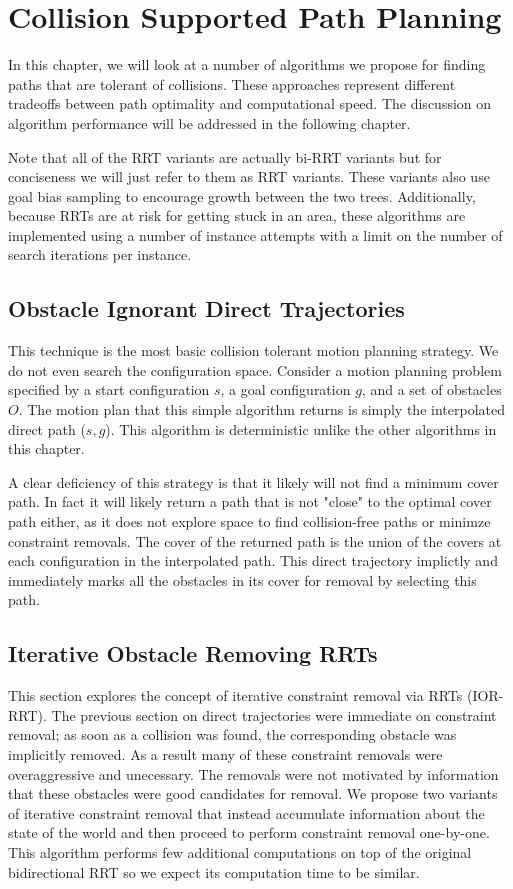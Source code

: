 \chapter{Collision Supported Path Planning}
In this chapter, we will look at a number of algorithms we propose for finding paths that are tolerant of collisions. These approaches represent different tradeoffs between path optimality and computational speed. The discussion on algorithm performance will be addressed in the following chapter.

Note that all of the RRT variants are actually bi-RRT variants but for conciseness we will just refer to them as RRT variants. These variants also use goal bias sampling to encourage growth between the two trees. Additionally, because RRTs are at risk for getting stuck in an area, these algorithms are implemented using a number of instance attempts with a limit on the number of search iterations per instance. 

\section{Obstacle Ignorant Direct Trajectories}
This technique is the most basic collision tolerant motion planning strategy. We do not even search the configuration space. Consider a motion planning problem specified by a start configuration $s$, a goal configuration $g$, and a set of obstacles $O$. The motion plan that this simple algorithm returns is simply the interpolated direct path ($s, g$). This algorithm is deterministic unlike the other algorithms in this chapter. 

A clear deficiency of this strategy is that it likely will not find a minimum cover path. In fact it will likely return a path that is not "close" to the optimal cover path either, as it does not explore space to find collision-free paths or minimze constraint removals. The cover of the returned path is the union of the covers at each configuration in the interpolated path. This direct trajectory implictly and immediately marks all the obstacles in its cover for removal by selecting this path.

\section{Iterative Obstacle Removing RRTs}
This section explores the concept of iterative constraint removal via RRTs (IOR-RRT). The previous section on direct trajectories were immediate on constraint removal; as soon as a collision was found, the corresponding obstacle was implicitly removed. As a result many of these constraint removals were overaggressive and unecessary. The removals were not motivated by information that these obstacles were good candidates for removal. We propose two variants of iterative constraint removal that instead accumulate information about the state of the world and then proceed to perform constraint removal one-by-one. This algorithm performs few additional computations on top of the original bidirectional RRT so we expect its computation time to be similar.

